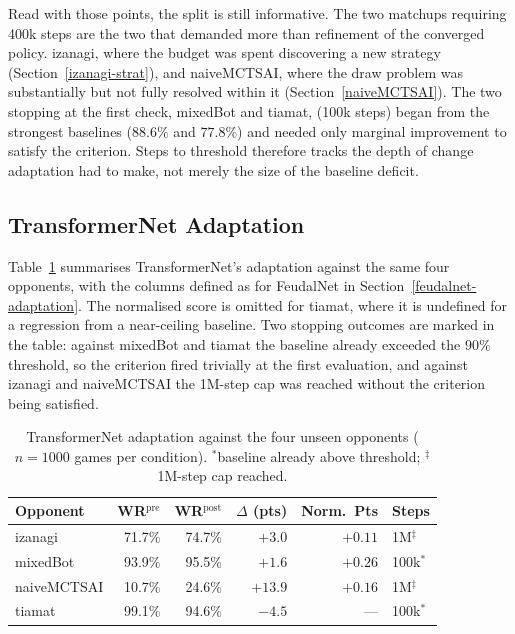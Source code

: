 \documentclass[sigconf,review=false]{acmart}
\begin{document}
Read with those points, the split is still informative. 
The two matchups requiring 400k steps are the two that demanded more than refinement of the converged policy. 
izanagi, where the budget was spent discovering a new strategy (Section~\ref{izanagi-strat}), and naiveMCTSAI, where the draw problem was substantially but not fully resolved within it (Section~\ref{naiveMCTSAI}). 
The two stopping at the first check, mixedBot and tiamat, (100k steps) began from the strongest baselines ($88.6\%$ and $77.8\%$) and needed only marginal improvement to satisfy the criterion. 
Steps to threshold therefore tracks the depth of change adaptation had to make, not merely the size of the baseline deficit.

\subsection{TransformerNet Adaptation}
\label{transformernet-adaptation}

Table~\ref{tab:transformernet-adaptation} summarises TransformerNet's adaptation against the same four opponents, with the columns defined as for FeudalNet in Section~\ref{feudalnet-adaptation}.
The normalised score is omitted for tiamat, where it is undefined for a regression from a near-ceiling baseline.
Two stopping outcomes are marked in the table: against mixedBot and tiamat the baseline already exceeded the $90\%$ threshold, so the criterion fired trivially at the first evaluation, and against izanagi and naiveMCTSAI the 1M-step cap was reached without the criterion being satisfied.

\begin{table}[t]
  \caption{TransformerNet adaptation against the four unseen opponents ($n = 1000$ games per condition). $^{*}$baseline already above threshold; $^{\ddagger}$1M-step cap reached.}
  \label{tab:transformernet-adaptation}
  \begin{tabular}{lrrrrl}
    \toprule
    Opponent & WR$^{\mathrm{pre}}$ & WR$^{\mathrm{post}}$
             & $\Delta$ (pts) & Norm.\ Pts & Steps \\
    \midrule
    izanagi     & 71.7\% & 74.7\% &  $+3.0$ & $+0.11$ & 1M$^{\ddagger}$ \\
    mixedBot    & 93.9\% & 95.5\% &  $+1.6$ & $+0.26$ & 100k$^{*}$ \\
    naiveMCTSAI & 10.7\% & 24.6\% & $+13.9$ & $+0.16$ & 1M$^{\ddagger}$ \\
    tiamat      & 99.1\% & 94.6\% &  $-4.5$ & ---     & 100k$^{*}$ \\
    \bottomrule
  \end{tabular}
\end{table}
\end{document}
